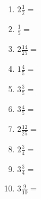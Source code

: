 \documentclass[12pt]{article}
\begin{document}
\begin{enumerate}
\newpage
\item \large $ 2 \frac{1}{2} = $ \vspace{1.5cm}
\item \large $ \frac{1}{5} = $ \vspace{1.5cm}
\item \large $ 2 \frac{14}{25} = $ \vspace{1.5cm}
\item \large $ 1 \frac{4}{5} = $ \vspace{1.5cm}
\item \large $ 3 \frac{3}{5} = $ \vspace{1.5cm}
\item \large $ 3 \frac{4}{5} = $ \vspace{1.5cm}
\item \large $ 2 \frac{12}{25} = $ \vspace{1.5cm}
\item \large $ 2 \frac{3}{4} = $ \vspace{1.5cm}
\item \large $ 3 \frac{3}{4} = $ \vspace{1.5cm}
\item \large $ 3 \frac{9}{10} = $ \vspace{1.5cm}
\end{enumerate}\newpage
\end{document}
